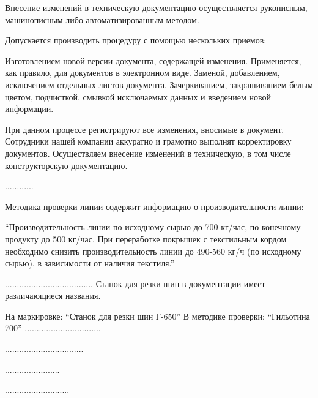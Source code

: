 Внесение изменений в техническую документацию осуществляется рукописным, машинописным либо автоматизированным методом.

Допускается производить процедуру с помощью нескольких приемов:

Изготовлением новой версии документа, содержащей изменения. Применяется, как правило, для документов в электронном виде.
Заменой, добавлением, исключением отдельных листов документа.
Зачеркиванием, закрашиванием белым цветом, подчисткой, смывкой исключаемых данных и введением новой информации.

При данном процессе регистрируют все изменения, вносимые в документ. Сотрудники нашей компании аккуратно и грамотно выполнят корректировку документов. Осуществляем внесение изменений в техническую, в том числе конструкторскую документацию.

............

Методика проверки линии содержит информацию о производительности линии:

\enquote{Производительность линии по исходному сырью до 700 кг/час, по конечному продукту до 500 кг/час. При переработке покрышек с текстильным кордом необходимо снизить производительность линии до 490-560 кг/ч (по исходному сырью), в зависимости от наличия текстиля.}



.....................................
Станок для резки шин в документации имеет различающиеся названия.

На маркировке: \enquote{Станок для резки шин Г-650}
В методике проверки:  \enquote{Гильотина 700}
................................



.................................





.......................



...........................



